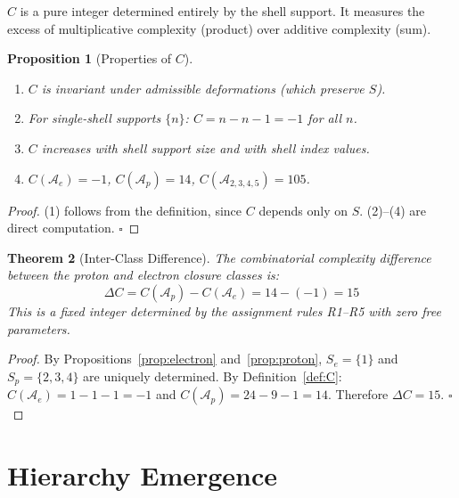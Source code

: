\documentclass[12pt]{article}
\newtheorem{theorem}{Theorem}
\newtheorem{proposition}[theorem]{Proposition}
\newcommand{\Acal}{\mathcal{A}}
\begin{document}
$C$ is a pure integer determined entirely by the shell support. It measures the excess of multiplicative complexity (product) over additive complexity (sum).

\begin{proposition}[Properties of $C$]\label{prop:C_properties}
\begin{enumerate}
    \item $C$ is invariant under admissible deformations (which preserve $S$).
    \item For single-shell supports $\{n\}$: $C = n - n - 1 = -1$ for all $n$.
    \item $C$ increases with shell support size and with shell index values.
    \item $C(\Acal_e) = -1$, \quad $C(\Acal_p) = 14$, \quad $C(\Acal_{2,3,4,5}) = 105$.
\end{enumerate}
\end{proposition}

\begin{proof}
(1) follows from the definition, since $C$ depends only on $S$. (2)--(4) are direct computation. $\square$
\end{proof}

\begin{theorem}[Inter-Class Difference]\label{thm:deltaC}
The combinatorial complexity difference between the proton and electron closure classes is:
\begin{equation}\label{eq:deltaC}
    \Delta C = C(\Acal_p) - C(\Acal_e) = 14 - (-1) = 15
\end{equation}
This is a fixed integer determined by the assignment rules R1--R5 with zero free parameters.
\end{theorem}

\begin{proof}
By Propositions~\ref{prop:electron} and~\ref{prop:proton}, $S_e = \{1\}$ and $S_p = \{2,3,4\}$ are uniquely determined. By Definition~\ref{def:C}: $C(\Acal_e) = 1 - 1 - 1 = -1$ and $C(\Acal_p) = 24 - 9 - 1 = 14$. Therefore $\Delta C = 15$. $\square$
\end{proof}

\section{Hierarchy Emergence}\label{sec:hierarchy}
\end{document}
